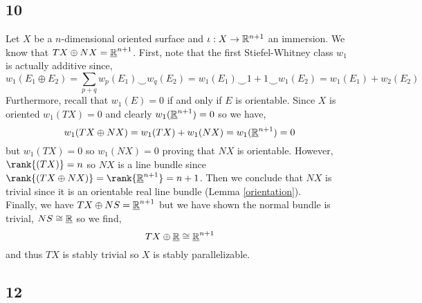 \documentclass[12pt]{extarticle}
\begin{document}
\subsection{10}

Let $X$ be a $n$-dimensional oriented surface and $\iota : X \to \mathbb{R}^{n+1}$ an immersion. We know that $TX \oplus N X = \underline{\mathbb{R}}^{n+1}$. First, note that the first Stiefel-Whitney class $w_1$ is actually additive since,
\[ w_1(E_1 \oplus E_2) = \sum_{p + q} w_p(E_1) \smile w_q(E_2) = w_1(E_1) \smile 1 + 1 \smile w_1(E_2) = w_1(E_1) + w_2(E_2) \]
Furthermore, recall that $w_1(E) = 0$ if and only if $E$ is orientable. Since $X$ is oriented $w_1(TX) = 0$ and clearly $w_1(\underline{\mathbb{R}}^{n+1}) = 0$ so we have,
\[ w_1(T X \oplus N X) = w_1(TX) + w_1(NX) = w_1(\underline{\mathbb{R}}^{n+1}) = 0 \]
but $w_1(TX) = 0$ so $w_1(NX) = 0$ proving that $NX$ is orientable. However, $\rank{(TX)} = n$ so $NX$ is a line bundle since $\rank{(TX \oplus NX)} = \rank{\underline{\R}^{n+1}} = n+1$. Then we conclude that $NX$ is trivial since it is an orientable real line bundle (Lemma \ref{orientation}). 
\bigskip\\
Finally, we have $TX \oplus NS = \underline{\mathbb{R}}^{n+1}$ but we have shown the normal bundle is trivial, $NS \cong \underline{\mathbb{R}}$ so we find,
\[ TX \oplus \underline{\mathbb{R}} \cong \underline{\mathbb{R}}^{n+1} \]
and thus $TX$ is stably trivial so $X$ is stably parallelizable. 

\subsection{12}
\end{document}
